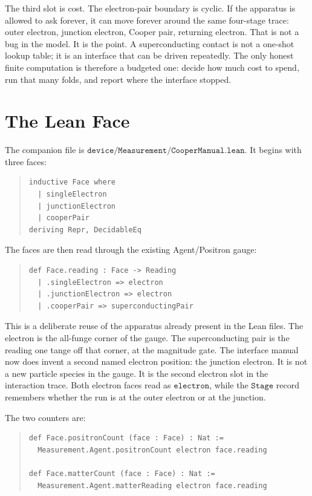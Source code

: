 The third slot is cost. The electron-pair boundary is cyclic. If the apparatus is allowed to ask forever, it can
move forever around the same four-stage trace: outer electron, junction electron, Cooper pair, returning
electron. That is not a bug in the model. It is the point. A superconducting contact is not a one-shot lookup
table; it is an interface that can be driven repeatedly. The only honest finite computation is therefore a
budgeted one: decide how much cost to spend, run that many folds, and report where the interface stopped.

\section{The Lean Face}

The companion file is \(\texttt{device/Measurement/CooperManual.lean}\). It begins with three faces:

\begin{quote}\small
\begin{verbatim}
inductive Face where
  | singleElectron
  | junctionElectron
  | cooperPair
deriving Repr, DecidableEq
\end{verbatim}
\end{quote}

The faces are then read through the existing Agent/Positron gauge:

\begin{quote}\small
\begin{verbatim}
def Face.reading : Face -> Reading
  | .singleElectron => electron
  | .junctionElectron => electron
  | .cooperPair => superconductingPair
\end{verbatim}
\end{quote}

This is a deliberate reuse of the apparatus already present in the Lean files. The electron is the all-funge
corner of the gauge. The superconducting pair is the reading one tange off that corner, at the magnitude gate.
The interface manual now does invent a second named electron position: the junction electron. It is not a new
particle species in the gauge. It is the second electron slot in the interaction trace. Both electron faces read
as \(\texttt{electron}\), while the \(\texttt{Stage}\) record remembers whether the run is at the outer electron
or at the junction.

The two counters are:

\begin{quote}\small
\begin{verbatim}
def Face.positronCount (face : Face) : Nat :=
  Measurement.Agent.positronCount electron face.reading

def Face.matterCount (face : Face) : Nat :=
  Measurement.Agent.matterReading electron face.reading
\end{verbatim}
\end{quote}

